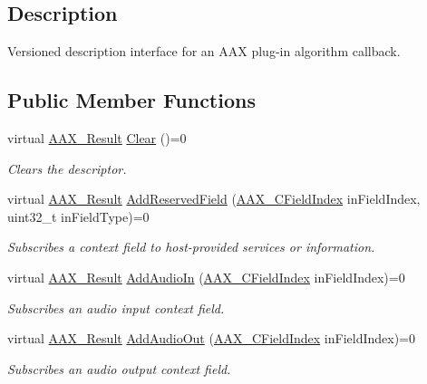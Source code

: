 \subsection{Description}
Versioned description interface for an A\+AX plug-\/in algorithm callback. \subsection*{Public Member Functions}
\begin{DoxyCompactItemize}
\item 
virtual \mbox{\hyperlink{a00392_a4d8f69a697df7f70c3a8e9b8ee130d2f}{A\+A\+X\+\_\+\+Result}} \mbox{\hyperlink{a01625_ab93e4b968f3239326ac1046b64eab2f5}{Clear}} ()=0
\begin{DoxyCompactList}\small\item\em Clears the descriptor. \end{DoxyCompactList}\item 
virtual \mbox{\hyperlink{a00392_a4d8f69a697df7f70c3a8e9b8ee130d2f}{A\+A\+X\+\_\+\+Result}} \mbox{\hyperlink{a01625_aa81ce274471a76742e71d02bc3442253}{Add\+Reserved\+Field}} (\mbox{\hyperlink{a00392_ae807f8986143820cfb5d6da32165c9c7}{A\+A\+X\+\_\+\+C\+Field\+Index}} in\+Field\+Index, uint32\+\_\+t in\+Field\+Type)=0
\begin{DoxyCompactList}\small\item\em Subscribes a context field to host-\/provided services or information. \end{DoxyCompactList}\item 
virtual \mbox{\hyperlink{a00392_a4d8f69a697df7f70c3a8e9b8ee130d2f}{A\+A\+X\+\_\+\+Result}} \mbox{\hyperlink{a01625_a81370dad377b30b3c5dec9ba0e9ad310}{Add\+Audio\+In}} (\mbox{\hyperlink{a00392_ae807f8986143820cfb5d6da32165c9c7}{A\+A\+X\+\_\+\+C\+Field\+Index}} in\+Field\+Index)=0
\begin{DoxyCompactList}\small\item\em Subscribes an audio input context field. \end{DoxyCompactList}\item 
virtual \mbox{\hyperlink{a00392_a4d8f69a697df7f70c3a8e9b8ee130d2f}{A\+A\+X\+\_\+\+Result}} \mbox{\hyperlink{a01625_a70e7e5c55208bcafd6b402eebf12aeb7}{Add\+Audio\+Out}} (\mbox{\hyperlink{a00392_ae807f8986143820cfb5d6da32165c9c7}{A\+A\+X\+\_\+\+C\+Field\+Index}} in\+Field\+Index)=0
\begin{DoxyCompactList}\small\item\em Subscribes an audio output context field. \end{DoxyCompactList}\item 

\end{DoxyCompactItemize}
